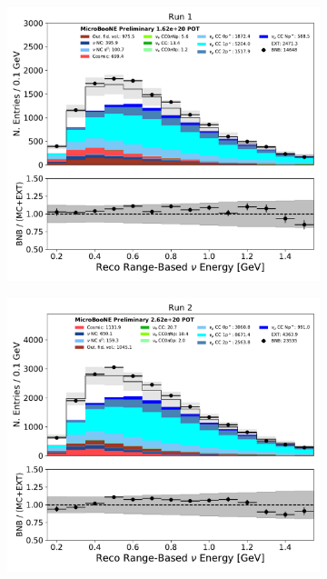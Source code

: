 \begin{figure}[hbt!] 
\begin{center}
    \begin{subfigure}[b]{0.35\textwidth}
        \centering
        \includegraphics[width=1.00\textwidth]{NuMuCCsel/Images/Ryan/Run1/reco_nu_e_range_v_08052020_full_samples_longest_noCRT_event_category.pdf}
    \end{subfigure}
    \begin{subfigure}[b]{0.35\textwidth}
        \centering
        \includegraphics[width=1.00\textwidth]{NuMuCCsel/Images/Ryan/Run2/reco_nu_e_range_v_08052020_full_samples_longest_noCRT_event_category.pdf}

\end{subfigure}
\end{center}
\end{figure}
